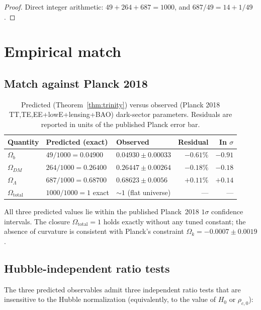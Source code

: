 \documentclass[11pt,reqno]{amsart}
\theoremstyle{plain}
\theoremstyle{definition}
\theoremstyle{remark}
\begin{document}
\begin{proof}
Direct integer arithmetic: $49 + 264 + 687 = 1000$, and
$687/49 = 14 + 1/49$.
\end{proof}

\section{Empirical match}\label{sec:match}

\subsection{Match against Planck 2018}

\begin{table}[h]
\centering
\caption{Predicted (Theorem~\ref{thm:trinity}) versus observed
(Planck 2018 TT,TE,EE+lowE+lensing+BAO) dark-sector parameters.
Residuals are reported in units of the published Planck error
bar.}
\label{tab:planck}
\begin{tabular}{lllrr}
\toprule
Quantity & Predicted (exact) & Observed & Residual & In $\sigma$ \\
\midrule
$\Omega_b$       & $49/1000 = 0.04900$  & $0.04930 \pm 0.00033$ & $-0.61\%$ & $-0.91$ \\
$\Omega_{DM}$    & $264/1000 = 0.26400$ & $0.26447 \pm 0.00264$ & $-0.18\%$ & $-0.18$ \\
$\Omega_\Lambda$ & $687/1000 = 0.68700$ & $0.68623 \pm 0.0056$  & $+0.11\%$ & $+0.14$ \\
\midrule
$\Omega_\mathrm{total}$ & $1000/1000 = 1$ exact & $\sim 1$ (flat universe) & --- & --- \\
\bottomrule
\end{tabular}
\end{table}

All three predicted values lie within the published Planck~2018
$1\sigma$ confidence intervals. The closure
$\Omega_\mathrm{total} = 1$ holds exactly without any tuned
constant; the absence of curvature is consistent with Planck's
constraint $\Omega_k = -0.0007 \pm 0.0019$.

\subsection{Hubble-independent ratio tests}

The three predicted observables admit three independent ratio
tests that are insensitive to the Hubble normalization (equivalently,
to the value of $H_0$ or $\rho_{c,0}$):
\end{document}
